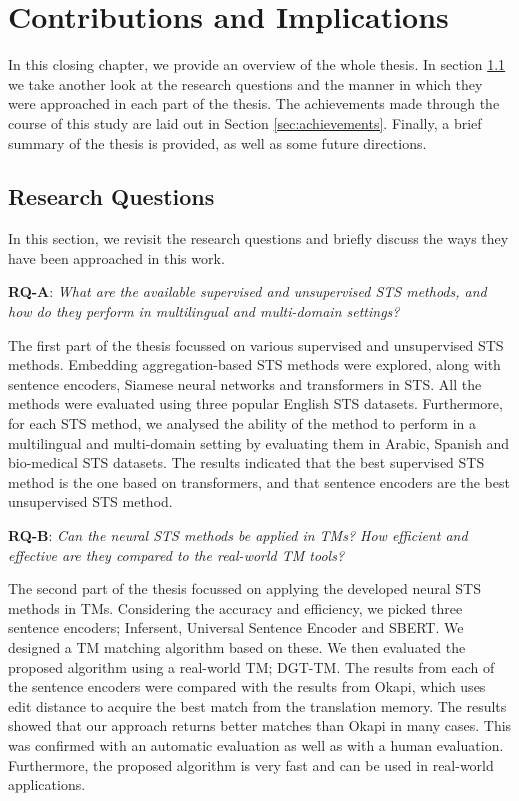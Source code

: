 \chapter{Contributions and Implications}
\label{cha:conclusions}

In this closing chapter, we provide an overview of the whole thesis. In section \ref{sec:rq} we take another look at the research questions and the manner in which they were approached in each part of the thesis. The achievements made through the course of this study are laid out in Section \ref{sec:achievements}. Finally, a brief summary of the thesis is provided, as well as some future directions.

\section{Research Questions}
\label{sec:rq}
In this section, we revisit the research questions and briefly discuss the ways they have been approached in this work.

\textbf{RQ-A}: \textit{What are the available supervised and unsupervised STS methods, and how do they perform in multilingual and multi-domain settings?}

The first part of the thesis focussed on various supervised and unsupervised STS methods. Embedding aggregation-based STS methods were explored, along with sentence encoders, Siamese neural networks and transformers in STS. All the methods were evaluated using three popular English STS datasets. Furthermore, for each STS method, we analysed the ability of the method to perform in a multilingual and multi-domain setting by evaluating them in Arabic, Spanish and bio-medical STS datasets. The results indicated that the best supervised STS method is the one based on transformers, and that sentence encoders are the best unsupervised STS method.

\textbf{RQ-B}: \textit{Can the neural STS methods be applied in TMs? How efficient and effective are they compared to the real-world TM tools?}

The second part of the thesis focussed on applying the developed neural STS methods in TMs. Considering the accuracy and efficiency, we picked three sentence encoders; Infersent, Universal Sentence Encoder and SBERT. We designed a TM matching algorithm based on these. We then evaluated the proposed algorithm using a real-world TM; DGT-TM. The results from each of the sentence encoders were compared with the results from Okapi, which uses edit distance to acquire the best match from the translation memory. The results showed that our approach returns better matches than Okapi in many cases. This was confirmed with an automatic evaluation as well as with a human evaluation. Furthermore, the proposed algorithm is very fast and can be used in real-world applications.

